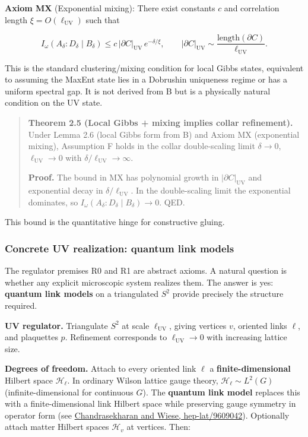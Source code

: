 \documentclass[11pt,a4paper]{article}
\theoremstyle{remark}
\begin{document}
\textbf{Axiom MX} (Exponential mixing): There exist constants \(c\) and correlation
length \(\xi = O(\ell_{\mathrm{UV}})\) such that

\[
I_\omega(A_\delta:D_\delta \mid B_\delta) \le
c\,\lvert\partial C\rvert_{\mathrm{UV}}\,e^{-\delta/\xi},
\qquad
\lvert\partial C\rvert_{\mathrm{UV}} \sim \frac{\mathrm{length}(\partial C)}{\ell_{\mathrm{UV}}}.
\]

This is the standard clustering/mixing condition for local Gibbs states,
equivalent to assuming the MaxEnt state lies in a Dobrushin uniqueness regime
or has a uniform spectral gap. It is not derived from B but is a physically
natural condition on the UV state.

\begin{quote}
\textbf{Theorem 2.5 (Local Gibbs + mixing implies collar refinement).} Under
Lemma 2.6 (local Gibbs form from B) and Axiom MX (exponential mixing),
Assumption F holds in the collar double-scaling limit \(\delta \to 0\),
\(\ell_{\mathrm{UV}} \to 0\) with \(\delta/\ell_{\mathrm{UV}} \to \infty\).

\textbf{Proof.} The bound in MX has polynomial growth in
\(\lvert\partial C\rvert_{\mathrm{UV}}\) and exponential decay in
\(\delta/\ell_{\mathrm{UV}}\). In the double-scaling limit the exponential dominates,
so \(I_\omega(A_\delta:D_\delta \mid B_\delta) \to 0\). QED.
\end{quote}

This bound is the quantitative hinge for constructive gluing.

\subsubsection{Concrete UV realization: quantum link models}\label{concrete-uv-realization-quantum-link-models}

The regulator premises R0 and R1 are abstract axioms. A natural question is
whether any explicit microscopic system realizes them. The answer is yes:
\textbf{quantum link models} on a triangulated \(S^2\) provide precisely the structure
required.

\textbf{UV regulator.} Triangulate \(S^2\) at scale \(\ell_{\mathrm{UV}}\), giving vertices \(v\),
oriented links \(\ell\), and plaquettes \(p\). Refinement corresponds to
\(\ell_{\mathrm{UV}} \to 0\) with increasing lattice size.

\textbf{Degrees of freedom.} Attach to every oriented link \(\ell\) a
\textbf{finite-dimensional} Hilbert space \(\mathcal{H}_\ell\). In ordinary Wilson
lattice gauge theory, \(\mathcal{H}_\ell \sim L^2(G)\) (infinite-dimensional for
continuous \(G\)). The \textbf{quantum link model} replaces this with a finite-dimensional
link Hilbert space while preserving gauge symmetry in operator form (see
\href{https://arxiv.org/abs/hep-lat/9609042}{Chandrasekharan and Wiese, hep-lat/9609042}).
Optionally attach matter Hilbert spaces \(\mathcal{H}_v\) at vertices. Then:
\end{document}
